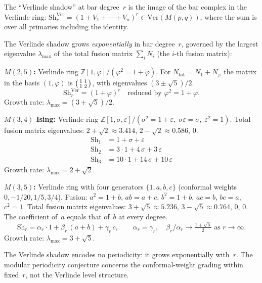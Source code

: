 \documentclass[11pt]{article}
\newcommand{\Z}{\mathbb{Z}}
\providecommand{\ClaimStatusProvedHere}{\textup{proved here}}
\begin{document}
The ``Verlinde shadow'' at bar degree~$r$ is the image of
the bar complex in the Verlinde ring:
$\mathrm{Sh}_r^{\mathrm{Ver}} = (1 + V_1 + \cdots + V_n)^r
\in \mathrm{Ver}(M(p,q))$,
where the sum is over all primaries including the identity.

\begin{computation}[Verlinde shadows; \ClaimStatusProvedHere]
\label{comp:verlinde-shadows}
The Verlinde shadow grows \emph{exponentially} in bar degree~$r$,
governed by the largest eigenvalue $\lambda_{\max}$ of the
total fusion matrix $\sum_i N_i$ (the $i$-th fusion matrix):

\smallskip\noindent
\textbf{$M(2,5)$:}
Verlinde ring $\Z[1,\varphi]/(\varphi^2 = 1+\varphi)$.
For $N_{\mathrm{tot}}=N_1+N_\varphi$ the matrix in the basis
$(1,\varphi)$ is
$\begin{psmallmatrix}1&1\\[1pt]1&2\end{psmallmatrix}$, with
eigenvalues $(3\pm\sqrt5)/2$.
\[
\mathrm{Sh}_r^{\mathrm{Ver}}
= (1+\varphi)^r \quad\text{reduced by }\varphi^2=1+\varphi.
\]
Growth rate: $\lambda_{\max} = (3+\sqrt5)/2$.

\smallskip\noindent
\textbf{$M(3,4)$ Ising:}
Verlinde ring $\Z[1,\sigma,\varepsilon]/(\sigma^2 = 1+\varepsilon,\;
\sigma\varepsilon = \sigma,\; \varepsilon^2 = 1)$.
Total fusion matrix eigenvalues: $2 + \sqrt{2} \approx 3.414$,
$2 - \sqrt{2} \approx 0.586$, $0$.
\begin{align*}
\mathrm{Sh}_1 &= 1 + \sigma + \varepsilon \\
\mathrm{Sh}_2 &= 3 \cdot 1 + 4\,\sigma + 3\,\varepsilon \\
\mathrm{Sh}_3 &= 10 \cdot 1 + 14\,\sigma + 10\,\varepsilon
\end{align*}
Growth rate: $\lambda_{\max} = 2 + \sqrt{2}$.

\smallskip\noindent
\textbf{$M(3,5)$:}
Verlinde ring with four generators $\{1, a, b, c\}$
(conformal weights $0, -1/20, 1/5, 3/4$).
Fusion: $a^2 = 1 + b$, $ab = a + c$, $b^2 = 1 + b$,
$ac = b$, $bc = a$, $c^2 = 1$.
Total fusion matrix eigenvalues:
$3 + \sqrt{5} \approx 5.236$, $3 - \sqrt{5} \approx 0.764$, $0$, $0$.
The coefficient of~$a$ equals that of~$b$ at every degree.
\[
\mathrm{Sh}_r
= \alpha_r \cdot 1 + \beta_r \,(a + b) + \gamma_r \, c,
\qquad \alpha_r = \gamma_r, \quad
\beta_r / \alpha_r \to \tfrac{1+\sqrt{5}}{2}
\text{ as } r \to \infty.
\]
Growth rate: $\lambda_{\max} = 3 + \sqrt{5}$.

\medskip\noindent
The Verlinde shadow encodes no periodicity: it grows
exponentially with~$r$.  The modular periodicity conjecture
concerns the conformal-weight grading within fixed~$r$,
not the Verlinde level structure.
\end{computation}
\end{document}
